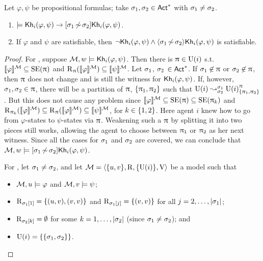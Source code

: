\begin{proposition}\label{prop:ref-preserves-gains}
Let $\varphi,\psi$ be propositional formulas; take $\plan_1,\plan_2\in\ACT^*$ with $\plan_1\neq\plan_2$.
\begin{enumerate}
\item\label{itm:preservesknowledge} $\models \khi(\varphi,\psi) \ra \refbox{\plan_1}{\plan_2}\khi(\varphi,\psi)$.
\item\label{itm:gainsknowledge} If $\varphi$ and $\psi$ are satisfiable, then $\neg\khi(\varphi,\psi) \wedge \refdiam{\plan_1}{\plan_2}\khi(\varphi,\psi)$ is satisfiable.
\end{enumerate}
\end{proposition}
\begin{proof}
For , suppose $\modults, w \models \khi(\varphi,\psi)$.
Then there is $\plans \in \Unc(i)$ s.t. $\truthset{\modults}{\varphi} \subseteq \stexec(\plans)$ and $\R_\plans(\truthset{\modults}{\varphi}) \subseteq \truthset{\modults}{\psi}$.
Let $\plan_1$, $\plan_2$ $\in \ACT^*$.
If $\plan_1 \not\in \plans$ or $\plan_2 \not\in \plans$, then $\plans$ does not change and is still the witness for $\khi(\varphi,\psi)$.
If, however, $\plan_1,\plan_2 \in \plans$, there will be a partition of $\plans$, $\set{\plans_1,\plans_2}$ such that $\splitstr{\Unc(i)}{\lmodel{\Unc(i)}{\plans}{\set{\plans_1,\plans_2}}}{\plan_1}{\plan_2}$.
But this does not cause any problem since $\truthset{\modults}{\varphi} \subseteq \stexec(\plans) \subseteq \stexec(\plans_k)$ and $\R_{\plans_k}(\truthset{\modults}{\varphi}) \subseteq \R_\plans(\truthset{\modults}{\varphi}) \subseteq \truthset{\modults}{\psi}$, for $k\in\set{1,2}$.
Here agent $i$ knew how to %
go from $\varphi$-states to $\psi$-states via $\plans$.
Weakening such a $\plans$ by splitting it into two pieces still works, allowing the agent to choose between $\plans_1$ or $\plans_2$ as her next witness.
Since all the cases for $\plan_1$ and $\plan_2$ are covered, we can conclude that $\modults,w\models \refbox{\plan_1}{\plan_2}\khi(\varphi,\psi)$.

For , let $\plan_1 \neq \plan_2$, and let $\modults=\tup{\set{u,v},\R,\set{\Unc(i)},\V}$ be a model such that
\begin{itemize}
\item $\modults,u \models \varphi$ and $\modults,v \models \psi$;
\item $\R_{\plan_1[1]} = \set{(u,v),(v,v)}$ and $\R_{\plan_1[j]} = \set{(v,v)}$ for all $j = 2, \dots, \card{\plan_1}$;
\item $\R_{\plan_2[k]} = \emptyset$ for some $k = 1, \dots, \card{\plan_2}$ (since $\plan_1 \neq \plan_2$); and
\item $\Unc(i) = \set{\set{\plan_1,\plan_2}}$.
\end{itemize}


\end{proof}
